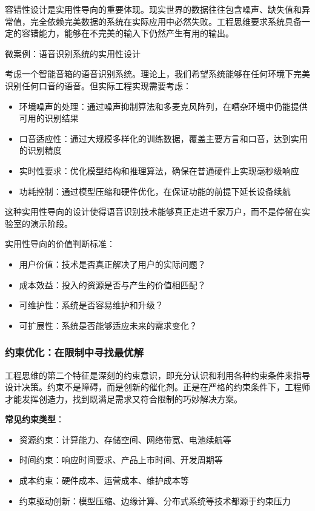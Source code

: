 容错性设计是实用性导向的重要体现。现实世界的数据往往包含噪声、缺失值和异常值，完全依赖完美数据的系统在实际应用中必然失败。工程思维要求系统具备一定的容错能力，能够在不完美的输入下仍然产生有用的输出。

微案例：语音识别系统的实用性设计

考虑一个智能音箱的语音识别系统。理论上，我们希望系统能够在任何环境下完美识别任何口音的语音。但实际工程实现需要考虑：

\begin{itemize}
\item 环境噪声的处理：通过噪声抑制算法和多麦克风阵列，在嘈杂环境中仍能提供可用的识别结果
\item 口音适应性：通过大规模多样化的训练数据，覆盖主要方言和口音，达到实用的识别精度
\item 实时性要求：优化模型结构和推理算法，确保在普通硬件上实现毫秒级响应
\item 功耗控制：通过模型压缩和硬件优化，在保证功能的前提下延长设备续航
\end{itemize}

这种实用性导向的设计使得语音识别技术能够真正走进千家万户，而不是停留在实验室的演示阶段。

实用性导向的价值判断标准：

\begin{itemize}
\item 用户价值：技术是否真正解决了用户的实际问题？
\item 成本效益：投入的资源是否与产生的价值相匹配？
\item 可维护性：系统是否容易维护和升级？
\item 可扩展性：系统是否能够适应未来的需求变化？
\end{itemize}

\subsubsection{约束优化：在限制中寻找最优解}

工程思维的第二个特征是深刻的约束意识，即充分认识和利用各种约束条件来指导设计决策。约束不是障碍，而是创新的催化剂。正是在严格的约束条件下，工程师才能发挥创造力，找到既满足需求又符合限制的巧妙解决方案。

 \textbf{常见约束类型}：
\begin{itemize}
 \item 资源约束：计算能力、存储空间、网络带宽、电池续航等
 \item 时间约束：响应时间要求、产品上市时间、开发周期等
 \item 成本约束：硬件成本、运营成本、维护成本等
 \item 约束驱动创新：模型压缩、边缘计算、分布式系统等技术都源于约束压力
\end{itemize}

